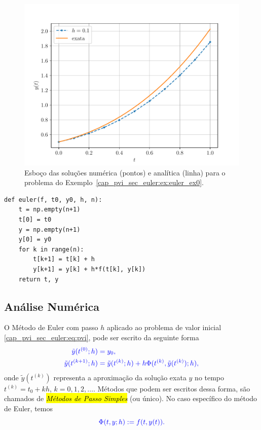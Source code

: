 \begin{ex}
\begin{figure}[H]
  \centering
  \includegraphics[width=\textwidth]{./cap_pvi/dados/fig_euler_ex0/fig}
  \caption{Esboço das soluções numérica (pontos) e analítica (linha) para o problema do Exemplo~\ref{cap_pvi_sec_euler:ex:euler_ex0}.}
  \label{fig:ex_Euler_1}
\end{figure}
\end{ex}

\begin{lstlisting}[caption=euler.py, label=cap_pvi_sec_euler:cod:euler]
def euler(f, t0, y0, h, n):
    t = np.empty(n+1)
    t[0] = t0
    y = np.empty(n+1)
    y[0] = y0
    for k in range(n):
        t[k+1] = t[k] + h
        y[k+1] = y[k] + h*f(t[k], y[k])
    return t, y
\end{lstlisting}

\subsection{Análise Numérica}

O Método de Euler com passo $h$ aplicado ao problema de valor inicial \eqref{cap_pvi_sec_euler:eq:pvi}, pode ser escrito da seguinte forma
\begin{subequations}\label{cap_pvi_sec_euler:eq:mps}\hleq
  \begin{align}
    \tilde{y}(t^{(0)}; h) &= y_0,\\
    \tilde{y}(t^{(k+1)}; h) &= \tilde{y}(t^{(k)}; h) + h\Phi(t^{(k)}, \tilde{y}(t^{(k)}); h),
  \end{align}
\end{subequations}
onde $\tilde{y}(t^{(k)})$ representa a aproximação da solução exata $y$ no tempo $t^{(k)}=t_0+ kh$, $k=0, 1, 2, \ldots$. Métodos que podem ser escritos dessa forma, são chamados de \hl{\emph{Métodos de Passo Simples}} (ou único). No caso específico do método de Euler, temos
\begin{equation}\color{blue}\Phi(t, y; h) := f(t, y(t)).
\end{equation}

